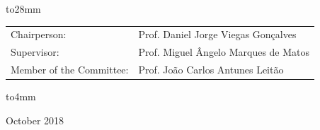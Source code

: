 \begin{singlespace}
{\vbox to28mm{
\vfil
{\large
\begin{center}
\begin{tabular}{p{}l}
Chairperson: &  Prof. Daniel Jorge Viegas Gonçalves \\
Supervisor: & Prof. Miguel Ângelo Marques de Matos\\
Member of the Committee: & Prof. João Carlos Antunes Leitão \\
\end{tabular}
\end{center}
}
\vfil
}%
\vskip28mm%
\vbox to4mm{\Large\bf
\vfil
\begin{center}
October 2018
\end{center}
\vfil
}%
}%
\end{singlespace}
\null\newpage